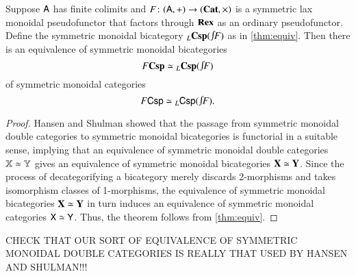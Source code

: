 \documentclass[reqno]{amsart}
\begin{document}
\begin{thm} \label{thm:bicat_equiv}
Suppose $\mathsf{A}$ has finite colimits and $F \colon(\mathsf{A},+) \to (\mathbf{Cat},\times)$ is a symmetric lax monoidal pseudofunctor that factors through $\mathbf{Rex}$ as an ordinary pseudofunctor.    Define the symmetric monoidal bicategory $_L\bCsp(\inta F)$ as in \cref{thm:equiv}.   Then there is an equivalence of symmetric monoidal bicategories
\[      F\bCsp \simeq {}_L \bCsp(\inta F)   \]
of symmetric monoidal categories
\[      F\Csp \simeq {}_L \Csp(\inta F)  . \]
\end{thm}

\begin{proof} Hansen and Shulman \cite{HS} showed that the passage from symmetric monoidal double categories to symmetric monoidal bicategories is  functorial in a suitable sense, implying
that an equivalence of symmetric monoidal double categories $\mathbf{\mathbb X} \simeq \mathbf{\mathbb Y}$ gives an equivalence of symmetric monoidal bicategories $\mathbf{X} \simeq \mathbf{Y}$.    Since the process of decategorifying a bicategory merely discards 2-morphisms and takes isomorphism classes of 1-morphisms, the equivalence of symmetric monoidal bicategories $\mathbf{X} \simeq \mathbf{Y}$ in turn induces an equivalence of symmetric monoidal categories $\mathsf{X} \simeq \mathsf{Y}$.   Thus, the theorem follows from \cref{thm:equiv}. \end{proof}

CHECK THAT OUR SORT OF EQUIVALENCE OF SYMMETRIC MONOIDAL DOUBLE CATEGORIES IS REALLY THAT USED BY HANSEN AND SHULMAN!!!

\end{document}
